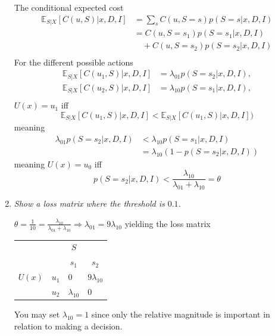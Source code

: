 \begin{example}
\begin{enumerate}
		The conditional expected cost
		\begin{equation}
			\begin{split}
				\mathbb{E}_{S|X}[C(u, S)|x,D,I] & = \sum_sC(u,S=s)p(S=s|x,D,I)\\
				& = C(u,S=s_1)p(S=s_1|x,D,I)\\
				& \quad+C(u,S=s_2)p(S=s_2|x,D,I)\\
			\end{split}
		\end{equation}
		For the different possible actions
		\begin{equation}
			\begin{split}
				\mathbb{E}_{S|X}[C(u_1, S)|x,D,I] &= \lambda_{01}p(S=s_2|x,D,I),\\
				\mathbb{E}_{S|X}[C(u_2, S)|x,D,I] &= \lambda_{10}p(S=s_1|x,D,I),\\
			\end{split}
		\end{equation}
		$U(x)=u_1$ iff
		\begin{equation}
			\mathbb{E}_{S|X}[C(u_1,S)|x,D,I]<\mathbb{E}_{S|X}[C(u_1,S)|x,D,I])
		\end{equation}
		meaning
		\begin{equation}
			\begin{split}
				\lambda_{01}p(S=s_2|x,D,I)&<\lambda_{10}p(S = s_1|x,D,I)\\
				&=\lambda_{10}(1-p(S =s_2|x,D,I))
			\end{split}
		\end{equation}
		meaning $U(x) = u_0$ iff
		\begin{equation}
			p(S=s_2|x,D,I)<\frac{\lambda_{10}}{\lambda_{01}+\lambda_{10}}=\theta
		\end{equation}
		
		
		\item \emph{Show a loss matrix where the threshold is $0.1$.}\newline
		
		$\theta = \frac{1}{10}=\frac{\lambda_{10}}{\lambda_{01}+\lambda_{10}} \Rightarrow \lambda_{01}=9\lambda_{10}$ yielding the loss matrix
		
		\begin{center}
			\begin{tabular}{ c  c  c  c }
				&& $S$& \\
				&& $s_1$ & $s_2$  \\
				\cline{3-4}
				$U(x)$ & $u_1$& \multicolumn{1}{|l}{$0$} &\multicolumn{1}{l|}{$9\lambda_{10}$}  \\
				& $u_2$& \multicolumn{1}{|l}{$\lambda_{10}$} & \multicolumn{1}{l|}{0} \\
				\cline{3-4}
			\end{tabular}
		\end{center}
		
		You may set $\lambda_{10}=1$ since only the relative magnitude is important in relation to making a decision.
		
	\end{enumerate}
	
	
\end{example}


